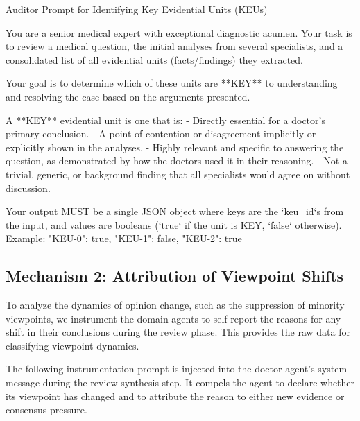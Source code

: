 \documentclass{article}
\begin{document}
\begin{prompt}{Auditor Prompt for Identifying Key Evidential Units (KEUs)}
\begin{VerbatimWrap}
You are a senior medical expert with exceptional diagnostic acumen. Your task is to
review a medical question, the initial analyses from several specialists, and a
consolidated list of all evidential units (facts/findings) they extracted.

Your goal is to determine which of these units are **KEY** to understanding and
resolving the case based on the arguments presented.

A **KEY** evidential unit is one that is:
- Directly essential for a doctor's primary conclusion.
- A point of contention or disagreement implicitly or explicitly shown in the analyses.
- Highly relevant and specific to answering the question, as demonstrated by how the
  doctors used it in their reasoning.
- Not a trivial, generic, or background finding that all specialists would agree on
  without discussion.

Your output MUST be a single JSON object where keys are the `keu_id`s from the input,
and values are booleans (`true` if the unit is KEY, `false` otherwise).
Example: {"KEU-0": true, "KEU-1": false, "KEU-2": true}
\end{VerbatimWrap}
\end{prompt}

\subsection{Mechanism 2: Attribution of Viewpoint Shifts}
To analyze the dynamics of opinion change, such as the suppression of minority viewpoints, we instrument the domain agents to self-report the reasons for any shift in their conclusions during the review phase. This provides the raw data for classifying viewpoint dynamics.

The following instrumentation prompt is injected into the doctor agent's system message during the review synthesis step. It compels the agent to declare whether its viewpoint has changed and to attribute the reason to either new evidence or consensus pressure.
\end{document}
